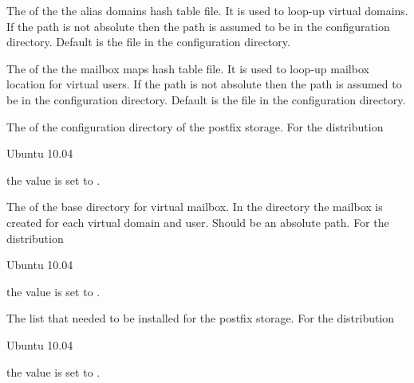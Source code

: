 The  of the the alias domains hash table file. It is used to loop-up
virtual domains. If the path is not absolute then the path is assumed to be
in the configuration directory. 
Default is the file  in the configuration directory.


The  of the the mailbox maps hash table file. It is used to loop-up
mailbox location for virtual users. 
If the path is not absolute then the path is assumed to be in the 
configuration directory. 
Default is the file  in the configuration directory.


The  of the configuration directory of the postfix storage. 
For the distribution
\begin{inparaitem}
\item[\TheDistribution{ubuntu}] Ubuntu 10.04
\end{inparaitem}
the value is set to .


The  of the base directory for virtual mailbox.
In the directory the mailbox is created for each virtual domain and user.
Should be an absolute path.
For the distribution
\begin{inparaitem}
\item[\TheDistribution{ubuntu}] Ubuntu 10.04
\end{inparaitem}
the value is set to .


The  list that needed to be installed for the postfix storage.
For the distribution
\begin{inparaitem}
\item[\TheDistribution{ubuntu}] Ubuntu 10.04
\end{inparaitem}
the value is set to .

